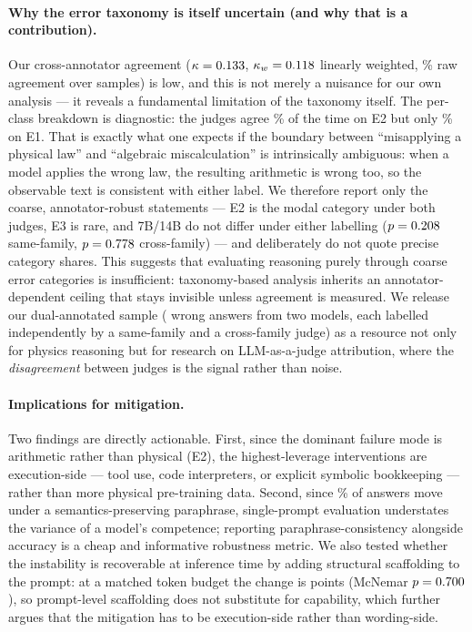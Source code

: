 \paragraph{Why the error taxonomy is itself uncertain (and why that is a
contribution).}
Our cross-annotator agreement ($\kappa=0.133$, $\kappa_w=0.118$
linearly weighted, \pctAgreeAnnotators\% raw agreement over \nbAnnotated{} samples)
is low, and this is not merely a nuisance for our own analysis --- it reveals a
fundamental limitation of the taxonomy itself. The per-class breakdown is
diagnostic: the judges agree \pctAgreeEtwo\% of the time on E2 but only
\pctAgreeEone\% on E1. That is exactly what one expects if the boundary between
``misapplying a physical law'' and ``algebraic miscalculation'' is intrinsically
ambiguous: when a model applies the wrong law, the resulting arithmetic is wrong
too, so the observable text is consistent with either label. We therefore report
only the coarse, annotator-robust statements --- E2 is the modal category under
both judges, E3 is rare, and 7B/14B do not differ under either labelling
($p=0.208$ same-family, $p=0.778$ cross-family) --- and
deliberately do not quote precise category shares. This suggests that evaluating
reasoning purely through coarse error categories is insufficient: taxonomy-based
analysis inherits an annotator-dependent ceiling that stays invisible unless
agreement is measured. We release our dual-annotated sample (\nbAnnotated{} wrong
answers from two models, each labelled independently by a same-family and a
cross-family judge) as a resource not only for physics reasoning but for research
on LLM-as-a-judge attribution, where the \emph{disagreement} between judges is the
signal rather than noise.

\paragraph{Implications for mitigation.}
Two findings are directly actionable. First, since the dominant failure mode is
arithmetic rather than physical (E2), the highest-leverage interventions are
execution-side --- tool use, code interpreters, or explicit symbolic bookkeeping
--- rather than more physical pre-training data. Second, since
\pctChangedSevenBWording\% of answers move under a semantics-preserving paraphrase,
single-prompt evaluation understates the variance of a model's competence;
reporting paraphrase-consistency alongside accuracy is a cheap and informative
robustness metric. We also tested whether the instability is recoverable at
inference time by adding structural scaffolding to the prompt: at a matched token
budget the change is \scafDeltaPP{} points (McNemar $p=0.700$), so prompt-level
scaffolding does not substitute for capability, which further argues that the
mitigation has to be execution-side rather than wording-side.


